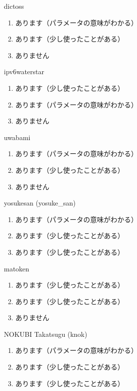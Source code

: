 \begin{prework}{ dictoss }
  \begin{enumerate}
  \item あります（パラメータの意味がわかる）
  \item あります（少し使ったことがある）
  \item ありません
  \end{enumerate}
\end{prework}

\begin{prework}{ ipv6waterstar }
  \begin{enumerate}
  \item あります（少し使ったことがある）
  \item あります（パラメータの意味がわかる）
  \item ありません
  \end{enumerate}
\end{prework}

\begin{prework}{ uwabami }
  \begin{enumerate}
  \item あります（パラメータの意味がわかる）
  \item あります（少し使ったことがある）
  \item ありません
  \end{enumerate}
\end{prework}

\begin{prework}{ yosukesan (yosuke\_san) }
  \begin{enumerate}
  \item あります（パラメータの意味がわかる）
  \item あります（少し使ったことがある）
  \item あります（少し使ったことがある）
  \end{enumerate}
\end{prework}

\begin{prework}{ matoken }
  \begin{enumerate}
  \item あります（少し使ったことがある）
  \item あります（少し使ったことがある）
  \item ありません
  \end{enumerate}
\end{prework}

\begin{prework}{ NOKUBI Takatsugu (knok) }
  \begin{enumerate}
  \item あります（パラメータの意味がわかる）
  \item あります（少し使ったことがある）
  \item あります（少し使ったことがある）
  \end{enumerate}
\end{prework}

